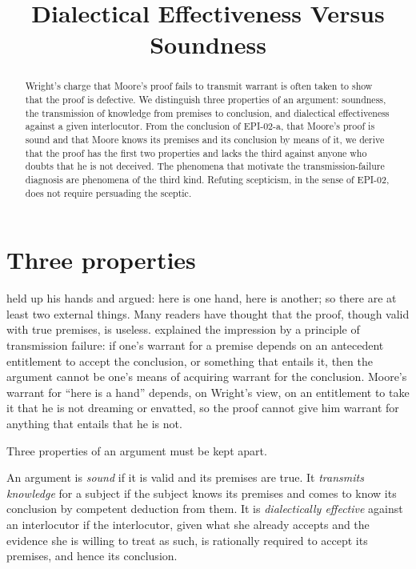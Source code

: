 \documentclass{situationist-preprint}
\title{Dialectical Effectiveness Versus Soundness}
\begin{document}
\maketitle

\begin{abstract}
Wright's charge that Moore's proof fails to transmit warrant is often taken to show that the proof is defective. We distinguish three properties of an argument: soundness, the transmission of knowledge from premises to conclusion, and dialectical effectiveness against a given interlocutor. From the conclusion of EPI-02-a, that Moore's proof is sound and that Moore knows its premises and its conclusion by means of it, we derive that the proof has the first two properties and lacks the third against anyone who doubts that he is not deceived. The phenomena that motivate the transmission-failure diagnosis are phenomena of the third kind. Refuting scepticism, in the sense of EPI-02, does not require persuading the sceptic.
\end{abstract}

\section{Three properties}

\citet{Moore1939} held up his hands and argued: here is one hand, here is another; so there are at least two external things. Many readers have thought that the proof, though valid with true premises, is useless. \citet{Wright2002} explained the impression by a principle of transmission failure: if one's warrant for a premise depends on an antecedent entitlement to accept the conclusion, or something that entails it, then the argument cannot be one's means of acquiring warrant for the conclusion. Moore's warrant for \enquote{here is a hand} depends, on Wright's view, on an entitlement to take it that he is not dreaming or envatted, so the proof cannot give him warrant for anything that entails that he is not.

Three properties of an argument must be kept apart.

\begin{definition}\label{d:three}
An argument is \emph{sound} if it is valid and its premises are true. It \emph{transmits knowledge} for a subject if the subject knows its premises and comes to know its conclusion by competent deduction from them. It is \emph{dialectically effective} against an interlocutor if the interlocutor, given what she already accepts and the evidence she is willing to treat as such, is rationally required to accept its premises, and hence its conclusion.
\end{definition}
\end{document}

